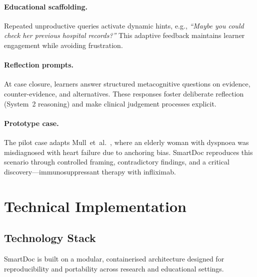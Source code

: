 \paragraph{Educational scaffolding.}
Repeated unproductive queries activate dynamic hints, e.g.,
\emph{“Maybe you could check her previous hospital records?”}
This adaptive feedback maintains learner engagement while avoiding frustration.

\paragraph{Reflection prompts.}
At case closure, learners answer structured metacognitive questions on evidence,
counter-evidence, and alternatives. These responses foster deliberate reflection
(System~2 reasoning) and make clinical judgement processes explicit.

\paragraph{Prototype case.}
The pilot case adapts Mull~et~al.~\cite{mull_cognitive_2015}, where an elderly
woman with dyspnoea was misdiagnosed with heart failure due to anchoring bias.
SmartDoc reproduces this scenario through controlled framing, contradictory
findings, and a critical discovery—immunosuppressant therapy with infliximab.

\section{Technical Implementation}
\label{sec:tech_impl}

\subsection{Technology Stack}

SmartDoc is built on a modular, containerised architecture designed for
reproducibility and portability across research and educational settings.

